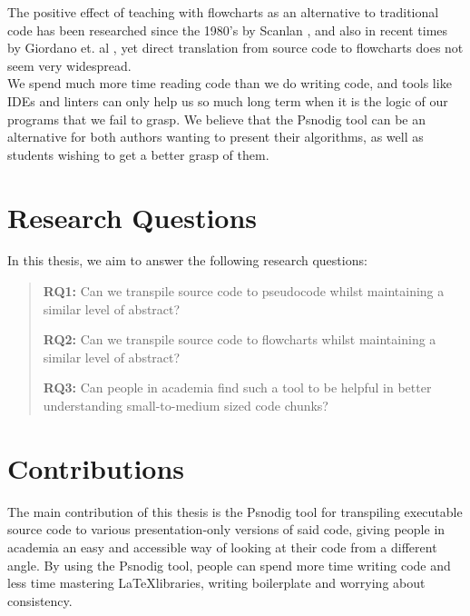 The positive effect of teaching with flowcharts as an alternative to traditional code has been researched since the 1980's by Scanlan \cite{DBLP:journals/software/Scanlan89}, and also in recent times by Giordano et. al \cite{7096016}, yet direct translation from source code to flowcharts does not seem very widespread. \hfill \\

We spend much more time reading code than we do writing code\cite[14]{martin2008clean}, and tools like IDEs and linters can only help us so much long term when it is the logic of our programs that we fail to grasp. We believe that the Psnodig tool can be an alternative for both authors wanting to present their algorithms, as well as students wishing to get a better grasp of them.

\section{Research Questions}

In this thesis, we aim to answer the following research questions: \hfill \\

\begin{quote}
    \textbf{RQ1:} Can we transpile source code to pseudocode whilst maintaining a similar level of abstract?

    \textbf{RQ2:} Can we transpile source code to flowcharts whilst maintaining a similar level of abstract?

    \textbf{RQ3:} Can people in academia find such a tool to be helpful in better understanding small-to-medium sized code chunks?
\end{quote}


\section{Contributions}

The main contribution of this thesis is the Psnodig tool for transpiling executable source code to various presentation-only versions of said code, giving people in academia an easy and accessible way of looking at their code from a different angle. By using the Psnodig tool, people can spend more time writing code and less time mastering \LaTeX libraries, writing boilerplate and worrying about consistency. \hfill \\

